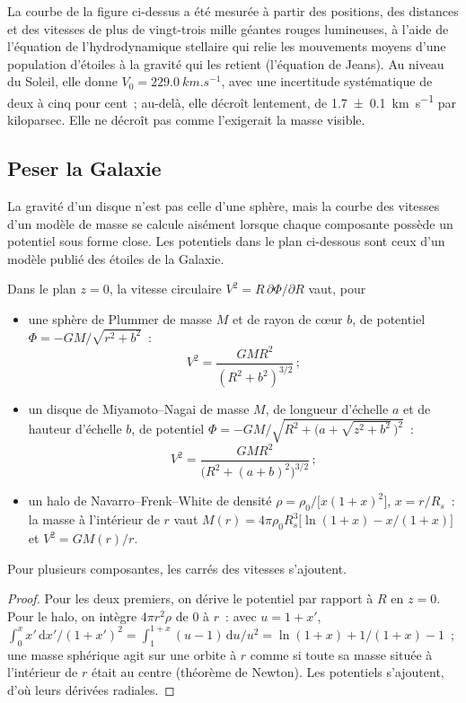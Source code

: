 La courbe de la figure ci-dessus a été mesurée à partir des positions, des distances
et des vitesses de plus de vingt-trois mille géantes rouges lumineuses,
à l'aide de l'équation de l'hydrodynamique stellaire qui relie les mouvements
moyens d'une population d'étoiles à la gravité qui les retient (l'équation de Jeans).
Au niveau du Soleil, elle donne $V_0 = \qty{229.0}{km.s^{-1}}$, avec une
incertitude systématique de deux à cinq pour cent~; au-delà, elle décroît lentement,
de \qty[separate-uncertainty=true]{1.7 \pm 0.1}{km.s^{-1}} par kiloparsec. Elle
ne décroît pas comme l'exigerait la masse visible.

\subsection*{Peser la Galaxie}

La gravité d'un disque n'est pas celle d'une sphère, mais la courbe des vitesses d'un
modèle de masse se calcule aisément lorsque chaque composante possède un potentiel
sous forme close. Les potentiels dans le plan ci-dessous sont ceux d'un modèle publié
des étoiles de la Galaxie.

\begin{proposition}\label{prop:b3:milky-way-galaxies:models}
Dans le plan $z = 0$, la vitesse circulaire $V^2 = R\,\partial\Phi/\partial R$
vaut, pour
\begin{itemize}
\item une sphère de Plummer de masse $M$ et de rayon de cœur $b$, de potentiel
  $\Phi = -GM/\sqrt{r^2 + b^2}$~:
  \[ V^2 = \frac{GMR^2}{(R^2 + b^2)^{3/2}}\,; \]
\item un disque de Miyamoto--Nagai de masse $M$, de longueur d'échelle $a$ et de
  hauteur d'échelle $b$, de potentiel
  $\Phi = -GM\big/\sqrt{R^2 + \bigl(a + \sqrt{z^2 + b^2}\,\bigr)^2}$~:
  \[ V^2 = \frac{GMR^2}{\bigl(R^2 + (a + b)^2\bigr)^{3/2}}\,; \]
\item un halo de Navarro--Frenk--White de densité
  $\rho = \rho_0\big/\bigl[x(1 + x)^2\bigr]$, $x = r/R_s$~: la masse à l'intérieur de $r$
  vaut $M(r) = 4\pi\rho_0R_s^3\bigl[\ln(1 + x) - x/(1 + x)\bigr]$ et
  $V^2 = GM(r)/r$.
\end{itemize}
Pour plusieurs composantes, les carrés des vitesses s'ajoutent.
\end{proposition}

\begin{proof}
Pour les deux premiers, on dérive le potentiel par rapport à $R$ en
$z = 0$. Pour le halo, on intègre $4\pi r^2\rho$ de 0 à $r$~: avec
$u = 1 + x'$, $\int_0^x x'\,\mathrm{d}x'/(1 + x')^2 =
\int_1^{1+x}(u - 1)\,\mathrm{d}u/u^2 = \ln(1 + x) + 1/(1 + x) - 1$~; une
masse sphérique agit sur une orbite à $r$ comme si toute sa masse située à
l'intérieur de $r$ était au centre (théorème de Newton). Les potentiels
s'ajoutent, d'où leurs dérivées radiales.
\end{proof}

